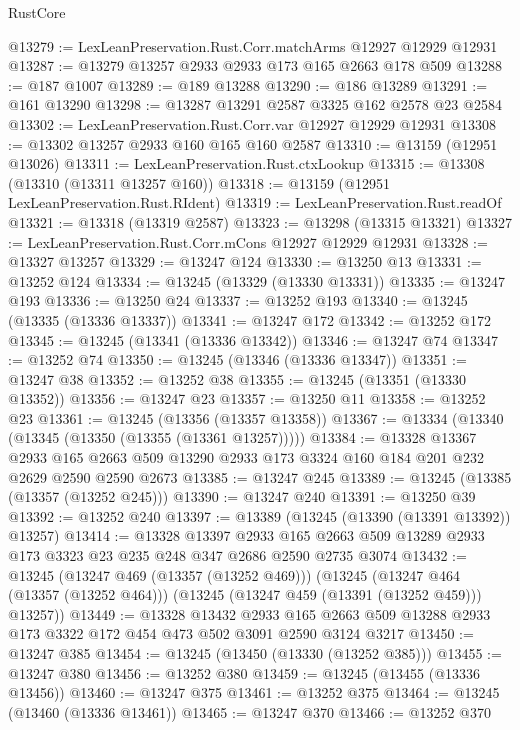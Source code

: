 \begin{lexlean}{RustCore}
\begin{coremodule}
@13279 := LexLeanPreservation.Rust.Corr.matchArms @12927 @12929 @12931
@13287 := @13279 @13257 @2933 @2933 @173 @165 @2663 @178 @509
@13288 := @187 @1007
@13289 := @189 @13288
@13290 := @186 @13289
@13291 := @161 @13290
@13298 := @13287 @13291 @2587 @3325 @162 @2578 @23 @2584
@13302 := LexLeanPreservation.Rust.Corr.var @12927 @12929 @12931
@13308 := @13302 @13257 @2933 @160 @165 @160 @2587
@13310 := @13159 (@12951 @13026)
@13311 := LexLeanPreservation.Rust.ctxLookup
@13315 := @13308 (@13310 (@13311 @13257 @160))
@13318 := @13159 (@12951 LexLeanPreservation.Rust.RIdent)
@13319 := LexLeanPreservation.Rust.readOf
@13321 := @13318 (@13319 @2587)
@13323 := @13298 (@13315 @13321)
@13327 := LexLeanPreservation.Rust.Corr.mCons @12927 @12929 @12931
@13328 := @13327 @13257
@13329 := @13247 @124
@13330 := @13250 @13
@13331 := @13252 @124
@13334 := @13245 (@13329 (@13330 @13331))
@13335 := @13247 @193
@13336 := @13250 @24
@13337 := @13252 @193
@13340 := @13245 (@13335 (@13336 @13337))
@13341 := @13247 @172
@13342 := @13252 @172
@13345 := @13245 (@13341 (@13336 @13342))
@13346 := @13247 @74
@13347 := @13252 @74
@13350 := @13245 (@13346 (@13336 @13347))
@13351 := @13247 @38
@13352 := @13252 @38
@13355 := @13245 (@13351 (@13330 @13352))
@13356 := @13247 @23
@13357 := @13250 @11
@13358 := @13252 @23
@13361 := @13245 (@13356 (@13357 @13358))
@13367 := @13334 (@13340 (@13345 (@13350 (@13355 (@13361 @13257)))))
@13384 := @13328
    @13367
    @2933
    @165
    @2663
    @509
    @13290
    @2933
    @173
    @3324
    @160
    @184
    @201
    @232
    @2629
    @2590
    @2590
    @2673
@13385 := @13247 @245
@13389 := @13245 (@13385 (@13357 (@13252 @245)))
@13390 := @13247 @240
@13391 := @13250 @39
@13392 := @13252 @240
@13397 := @13389 (@13245 (@13390 (@13391 @13392)) @13257)
@13414 := @13328
    @13397
    @2933
    @165
    @2663
    @509
    @13289
    @2933
    @173
    @3323
    @23
    @235
    @248
    @347
    @2686
    @2590
    @2735
    @3074
@13432 := @13245
    (@13247 @469 (@13357 (@13252 @469)))
    (@13245
      (@13247 @464 (@13357 (@13252 @464)))
      (@13245 (@13247 @459 (@13391 (@13252 @459))) @13257))
@13449 := @13328
    @13432
    @2933
    @165
    @2663
    @509
    @13288
    @2933
    @173
    @3322
    @172
    @454
    @473
    @502
    @3091
    @2590
    @3124
    @3217
@13450 := @13247 @385
@13454 := @13245 (@13450 (@13330 (@13252 @385)))
@13455 := @13247 @380
@13456 := @13252 @380
@13459 := @13245 (@13455 (@13336 @13456))
@13460 := @13247 @375
@13461 := @13252 @375
@13464 := @13245 (@13460 (@13336 @13461))
@13465 := @13247 @370
@13466 := @13252 @370

\end{coremodule}
\end{lexlean}

